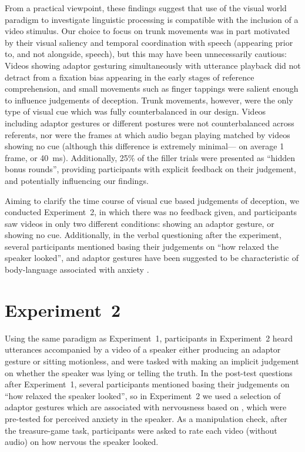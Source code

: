 \documentclass[a4paper,man,natbib]{apa6}
\newcommand*{\spex}[1]{``{#1}''} %
\begin{document}
From a practical viewpoint, these findings suggest that use of the visual world paradigm to investigate linguistic processing is compatible with the inclusion of a video stimulus.
Our choice to focus on trunk movements was in part motivated by their visual saliency and temporal coordination with speech (appearing prior to, and not alongside, speech), but this may have been unnecessarily cautious: 
Videos showing adaptor gesturing simultaneously with utterance playback did not detract from a fixation bias appearing in the early stages of reference comprehension, and small movements such as finger tappings were salient enough to influence judgements of deception.
Trunk movements, however, were the only type of visual cue which was fully counterbalanced in our design.
Videos including adaptor gestures or different postures were not counterbalanced across referents, nor were the frames at which audio began playing matched by videos showing no cue (although this difference is extremely minimal--- on average 1 frame, or 40~ms).
Additionally, 25\% of the filler trials were presented as ``hidden bonus rounds'', providing participants with explicit feedback on their judgement, and potentially influencing our findings. 

Aiming to clarify the time course of visual cue based judgements of deception, we conducted Experiment~2, in which there was no feedback given, and participants saw videos in only two different conditions: showing an adaptor gesture, or showing no cue. 
Additionally, in the verbal questioning after the experiment, several participants mentioned basing their judgements on \spex{how relaxed the speaker looked}, and adaptor gestures have been suggested to be characteristic of body-language associated with anxiety \citep[see][]{Gregersen2005}.

\section{Experiment~2}
Using the same paradigm as Experiment~1, participants in Experiment~2 heard utterances accompanied by a video of a speaker either producing an adaptor gesture or sitting motionless, and were tasked with making an implicit judgement on whether the speaker was lying or telling the truth.
In the post-test questions after Experiment~1, several participants mentioned basing their judgements on \spex{how relaxed the speaker looked}, so in Experiment~2 we used a selection of adaptor gestures which are associated with nervousness based on \citet{Gregersen2005}, which were pre-tested for perceived anxiety in the speaker.
As a manipulation check, after the treasure-game task, participants were asked to rate each video (without audio) on how nervous the speaker looked.
\end{document}
